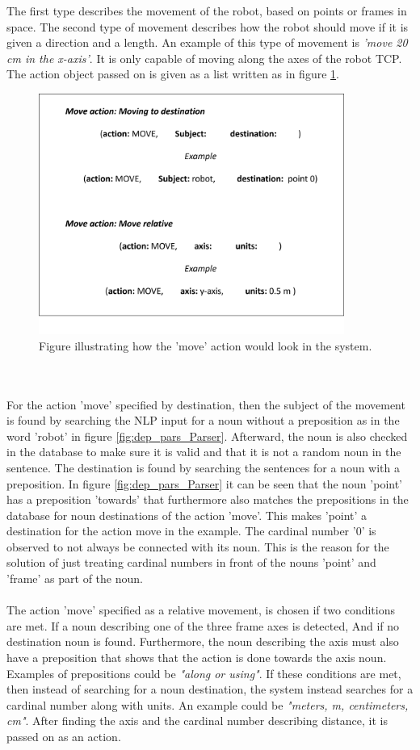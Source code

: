 The first type describes the movement of the robot, based on points or frames in space.
The second type of movement describes how the robot should move if it is given a direction and a length. An example of this type of movement is \textit{'move 20 cm in the x-axis'}.
It is only capable of moving along the axes of the robot TCP.
The action object passed on is given as a list written as in figure \ref{fig:action_obj}.
\begin{figure}[ht]
    \centering
    \includegraphics[width=10cm]{img/action_obj.png}
    \caption{Figure illustrating how the 'move' action would look in the system.}
    \label{fig:action_obj}
\end{figure}
\\\\
For the action 'move' specified by destination, then the subject of the movement is found by searching the NLP input for a noun without a preposition as in the word 'robot' in figure \ref{fig:dep_pars_Parser}. Afterward, the noun is also checked in the database to make sure it is valid and that it is not a random noun in the sentence. The destination is found by searching the sentences for a noun with a preposition. In figure \ref{fig:dep_pars_Parser} it can be seen that the noun 'point' has a preposition 'towards' that furthermore also matches the prepositions in the database for noun destinations of the action 'move'. This makes 'point' a destination for the action move in the example. The cardinal number '0' is observed to not always be connected with its noun. This is the reason for the solution of just treating cardinal numbers in front of the nouns 'point' and 'frame' as part of the noun.
\\\\
The action 'move' specified as a relative movement, is chosen if two conditions are met. If a noun describing one of the three frame axes is detected, And if no destination noun is found. Furthermore, the noun describing the axis must also have a preposition that shows that the action is done towards the axis noun. Examples of prepositions could be \textit{"along or using"}. If these conditions are met, then instead of searching for a noun destination, the system instead searches for a cardinal number along with units. An example could be \textit{"meters, m, centimeters, cm"}. After finding the axis and the cardinal number describing distance, it is passed on as an action.
